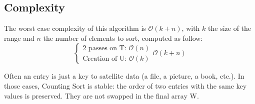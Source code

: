 \subsection{Complexity} The worst case complexity of this algorithm is $\mathcal{O}(k+n)$, with $k$ the size of the range and $n$ the number of elements to sort, computed as follow:
\[ 
\begin{cases}
\text{2 passes on T: } \mathcal{O}(n) \\
\text{Creation of U: } \mathcal{O}(k)
\end{cases} \mathcal{O}(k+n)
\]
\begin{remark} Often an entry is just a key to satellite data (a file, a picture, a book, etc.). In those cases, Counting Sort is stable: the order of two entries with the same key values is preserved. They are not swapped in the final array W. \end{remark}